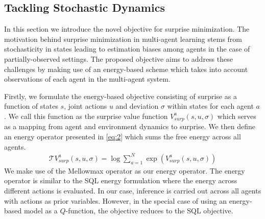\documentclass{article}
\begin{document}
\begin{multicols}{2}
\section{Tackling Stochastic Dynamics}
In this section we introduce the novel objective for surprise minimization. The motivation behind surprise minimization in multi-agent learning stems from stochasticity in states leading to estimation biases among agents in the case of partially-observed settings. The proposed objective aims to address these challenges by making use of an energy-based scheme which takes into account observations of each agent in the multi-agent system. 

Firstly, we formulate the energy-based objective consisting of surprise as a function of states $s$, joint actions $u$ and deviation $\sigma$ within states for each agent $a$. We call this function as the surprise value function $V_{surp}^{a}(s,u,\sigma)$ which serves as a mapping from agent and environment dynamics to surprise. We then define an energy operator presented in \autoref{eq:2} which sums the free energy across all agents. 
\begin{gather}
    \mathcal{T}V^{a}_{surp}(s,u,\sigma) = \log \sum_{a=1}^{N} \exp{(V^{a}_{surp}(s,u,\sigma))} \label{eq:2}
\end{gather}
We make use of the Mellowmax operator \cite{mellowmax} as our energy operator. The energy operator is similar to the SQL energy formulation \cite{sql} where the energy across different actions is evaluated. In our case, inference is carried out across all agents with actions as prior variables. However, in the special case of using an energy-based model as a $Q$-function, the objective reduces to the SQL objective.


\end{multicols}
\end{document}
